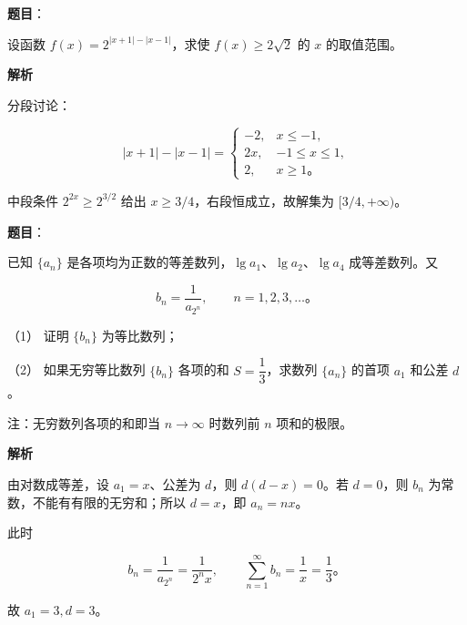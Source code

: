 \begin{answer}

\textbf{题目}：

设函数 $f(x)=2^{|x+1|-|x-1|}$，求使 $f(x)\geqslant2\sqrt2$ 的 $x$ 的取值范围。

\textbf{解析}

分段讨论：

\nopagebreak[4]
\[
|x+1|-|x-1|=
\begin{cases}
-2,&x\leqslant-1,\\
2x,&-1\leqslant x\leqslant1,\\
2,&x\geqslant1\text{。}
\end{cases}
\]

中段条件 $2^{2x}\geqslant2^{3/2}$ 给出 $x\geqslant3/4$，右段恒成立，故解集为 $[3/4,+\infty)$。

\gkanswer{答案：$\left[\dfrac34,+\infty\right)$}

\end{answer}
\begin{answer}

\textbf{题目}：

已知 $\{a_n\}$ 是各项均为正数的等差数列，$\lg a_1\text{、}\lg a_2\text{、}\lg a_4$ 成等差数列。又

\nopagebreak[4]
\[
b_n=\frac1{a_{2^n}},\qquad n=1,2,3,\ldots\text{。}
\]

（1） 证明 $\{b_n\}$ 为等比数列；

（2） 如果无穷等比数列 $\{b_n\}$ 各项的和 $S=\dfrac13$，求数列 $\{a_n\}$ 的首项 $a_1$ 和公差 $d$。

注：无穷数列各项的和即当 $n\to\infty$ 时数列前 $n$ 项和的极限。

\textbf{解析}


由对数成等差，设 $a_1=x$、公差为 $d$，则 $d(d-x)=0$。若 $d=0$，则 $b_n$ 为常数，不能有有限的无穷和；所以 $d=x$，即 $a_n=nx$。


此时

\nopagebreak[4]
\[
b_n=\frac1{a_{2^n}}=\frac1{2^nx},
\qquad
\sum_{n=1}^{\infty}b_n=\frac1x=\frac13\text{。}
\]

故 $a_1=3,d=3$。



\end{answer}
